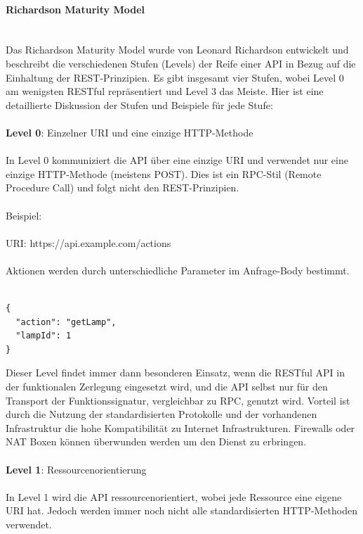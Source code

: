 \documentclass[../vs-script-first-v01.tex]{subfiles}
\begin{document}
\paragraph{Richardson Maturity Model\\\\}
Das Richardson Maturity Model wurde von Leonard Richardson entwickelt und beschreibt die verschiedenen Stufen (Levels) der Reife einer API in Bezug auf die Einhaltung der REST-Prinzipien. Es gibt insgesamt vier Stufen, wobei Level 0 am wenigsten RESTful repräsentiert und Level 3 das Meiste. Hier ist eine detaillierte Diskussion der Stufen und Beispiele für jede Stufe:
\\\\
\textbf{Level 0}: Einzelner URI und eine einzige HTTP-Methode
\\\\
In Level 0 kommuniziert die API über eine einzige URI und verwendet nur eine einzige HTTP-Methode (meistens POST). Dies ist ein RPC-Stil (Remote Procedure Call) und folgt nicht den REST-Prinzipien.
\\\\
Beispiel:
\\\\
URI: https://api.example.com/actions
\\\\
Aktionen werden durch unterschiedliche Parameter im Anfrage-Body bestimmt.\\\\
\noindent\begin{minipage}{\textwidth}
\begin{lstlisting}[caption={Level 0},captionpos=b,label={lst:level_0}]
{
  "action": "getLamp",
  "lampId": 1
}
\end{lstlisting}
\end{minipage}
Dieser Level findet immer dann besonderen Einsatz, wenn die RESTful API in der funktionalen Zerlegung eingesetzt wird, und die API selbst nur für den Transport der Funktionssignatur, vergleichbar zu RPC, genutzt wird. Vorteil ist durch die Nutzung der standardisierten Protokolle und der vorhandenen Infrastruktur die hohe Kompatibilität zu Internet Infrastrukturen. Firewalls oder NAT Boxen können überwunden werden um den Dienst zu erbringen. 
\\\\
\textbf{Level 1}: Ressourcenorientierung
\\\\
In Level 1 wird die API ressourcenorientiert, wobei jede Ressource eine eigene URI hat. Jedoch werden immer noch nicht alle standardisierten HTTP-Methoden verwendet.
\end{document}
